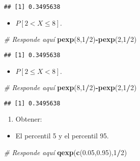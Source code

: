 \documentclass[
]{article}
\newenvironment{Shaded}{\begin{snugshade}}{\end{snugshade}}
\newcommand{\CommentTok}[1]{\textcolor[rgb]{0.56,0.35,0.01}{\textit{#1}}}
\newcommand{\DecValTok}[1]{\textcolor[rgb]{0.00,0.00,0.81}{#1}}
\newcommand{\FloatTok}[1]{\textcolor[rgb]{0.00,0.00,0.81}{#1}}
\newcommand{\KeywordTok}[1]{\textcolor[rgb]{0.13,0.29,0.53}{\textbf{#1}}}
\newcommand{\NormalTok}[1]{#1}
\newcommand{\OperatorTok}[1]{\textcolor[rgb]{0.81,0.36,0.00}{\textbf{#1}}}
\providecommand{\tightlist}{%
  \setlength{\itemsep}{0pt}\setlength{\parskip}{0pt}}
\begin{document}
\begin{verbatim}
## [1] 0.3495638
\end{verbatim}

\begin{itemize}
\tightlist
\item
  \(P [2 < X \leq 8]\).
\end{itemize}

\begin{Shaded}
\begin{Highlighting}[]
\CommentTok{# Responde aquí}
\KeywordTok{pexp}\NormalTok{(}\DecValTok{8}\NormalTok{,}\DecValTok{1}\OperatorTok{/}\DecValTok{2}\NormalTok{)}\OperatorTok{-}\KeywordTok{pexp}\NormalTok{(}\DecValTok{2}\NormalTok{,}\DecValTok{1}\OperatorTok{/}\DecValTok{2}\NormalTok{)}
\end{Highlighting}
\end{Shaded}

\begin{verbatim}
## [1] 0.3495638
\end{verbatim}

\begin{itemize}
\tightlist
\item
  \(P [2 \leq X < 8]\).
\end{itemize}

\begin{Shaded}
\begin{Highlighting}[]
\CommentTok{# Responde aquí}
\KeywordTok{pexp}\NormalTok{(}\DecValTok{8}\NormalTok{,}\DecValTok{1}\OperatorTok{/}\DecValTok{2}\NormalTok{)}\OperatorTok{-}\KeywordTok{pexp}\NormalTok{(}\DecValTok{2}\NormalTok{,}\DecValTok{1}\OperatorTok{/}\DecValTok{2}\NormalTok{)}
\end{Highlighting}
\end{Shaded}

\begin{verbatim}
## [1] 0.3495638
\end{verbatim}

\begin{enumerate}
\def\labelenumi{\arabic{enumi}.}
\setcounter{enumi}{1}
\tightlist
\item
  Obtener:
\end{enumerate}

\begin{itemize}
\tightlist
\item
  El percentil 5 y el percentil 95.
\end{itemize}

\begin{Shaded}
\begin{Highlighting}[]
\CommentTok{# Responde aquí}
\KeywordTok{qexp}\NormalTok{(}\KeywordTok{c}\NormalTok{(}\FloatTok{0.05}\NormalTok{,}\FloatTok{0.95}\NormalTok{),}\DecValTok{1}\OperatorTok{/}\DecValTok{2}\NormalTok{)}
\end{Highlighting}
\end{Shaded}
\end{document}
